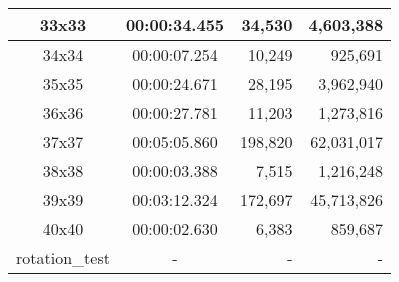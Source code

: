 \begin{center}
\begin{tabular}{|c|c|r|r|}
		33x33 & 00:00:34.455 & 34,530 & 4,603,388 \\ \hline
		34x34 & 00:00:07.254 & 10,249 & 925,691 \\ \hline
		35x35 & 00:00:24.671 & 28,195 & 3,962,940 \\ \hline
		36x36 & 00:00:27.781 & 11,203 & 1,273,816 \\ \hline
		37x37 & 00:05:05.860 & 198,820 & 62,031,017 \\ \hline
		38x38 & 00:00:03.388 & 7,515 & 1,216,248 \\ \hline
		39x39 & 00:03:12.324 & 172,697 & 45,713,826 \\ \hline
		40x40 & 00:00:02.630 & 6,383 & 859,687 \\ \hline
		rotation\_test & - & - & - \\ \hline

    \end{tabular}
\end{center}
